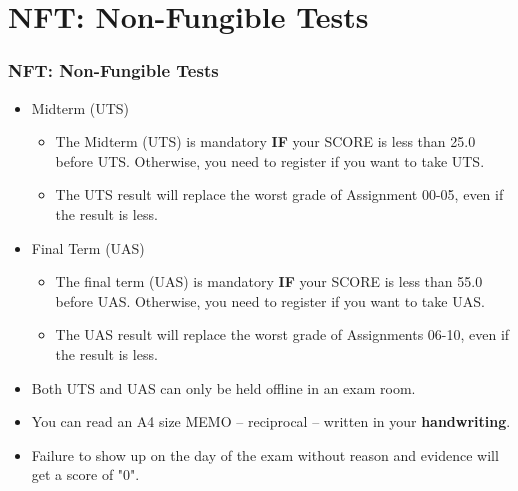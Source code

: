 \documentclass[aspectratio=169, xcolor=table, notheorems, hyperref={pdfpagelabels=false}]{beamer}
\begin{document}
\section{NFT: Non-Fungible Tests}
\begin{frame}
\frametitle{NFT: Non-Fungible Tests}
\begin{itemize}

\item Midterm (UTS)
\begin{itemize}
\item The Midterm (UTS) is mandatory \textbf{IF} your SCORE is less than 25.0 before UTS.
      Otherwise, you need to register if you want to take UTS.
\item The UTS result will replace the worst grade of Assignment 00-05, 
      even if the result is less.
\end{itemize}
\item Final Term (UAS)
\begin{itemize}
\item The final term (UAS) is mandatory \textbf{IF} your SCORE is less than 55.0 before UAS.
      Otherwise, you need to register if you want to take UAS.
\item The UAS result will replace the worst grade of Assignments 06-10,
      even if the result is less.
\end{itemize}
\item Both UTS and UAS can only be held offline in an exam room.
\item You can read an A4 size MEMO -- reciprocal -- written in your \textbf{handwriting}.
\item Failure to show up on the day of the exam without reason and evidence will get a score of "0".
\end{itemize}
\end{frame}

\end{document}
